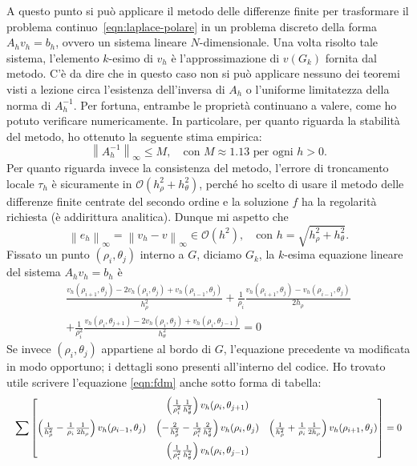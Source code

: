 \documentclass[a4paper]{article}
\newcommand{\bigO}[1]{\mathcal{O}\!\left(#1\right)}
\newcommand{\norminf}[1]{\left\lVert#1\right\rVert_\infty}
\begin{document}
A questo punto si può applicare il metodo delle differenze finite
per trasformare il problema continuo~\eqref{eqn:laplace-polare}
in un problema discreto della forma $A_h v_h = b_h$, ovvero
un sistema lineare $N$-dimensionale.
Una volta risolto tale sistema, l'elemento $k$-esimo di $v_h$
è l'approssimazione di $v(G_k)$ fornita dal metodo.
C'è da dire che in questo caso non si può applicare
nessuno dei teoremi visti a lezione circa
l'esistenza dell'inversa di $A_h$
o l'uniforme limitatezza della norma di $A_h^{-1}$.
Per fortuna, entrambe le proprietà continuano a valere,
come ho potuto verificare numericamente.
In particolare, per quanto riguarda la stabilità del metodo, ho ottenuto
la seguente stima empirica:
\[
\norminf{A_h^{-1}} \leq M, \quad \text{con $M \approx 1.13$ per ogni $h > 0$.}
\]
Per quanto riguarda invece la consistenza del metodo, l'errore di
troncamento locale $\tau_h$ è sicuramente in $\bigO{h_\rho^2 + h_\theta^2}$,
perché ho scelto di usare il metodo delle differenze finite centrate
del secondo ordine e la soluzione $f$ ha la regolarità
richiesta (è addirittura analitica). Dunque mi aspetto che
\[
\norminf{e_h} = \norminf{v_h-v} \in \bigO{h^2},
\quad \text{con $h = \sqrt{h_\rho^2 + h_\theta^2}$.}
\]
Fissato un punto $(\rho_i, \theta_j)$ interno a $G$, diciamo $G_k$,
la $k$-esima equazione lineare del sistema $A_h v_h = b_h$ è
\begin{equation} \label{eqn:fdm}
\begin{gathered}
\frac{v_h(\rho_{i+1},\theta_j)
    -2v_h(\rho_{i},  \theta_j)
     +v_h(\rho_{i-1},\theta_j)}{h_\rho^2}
+\frac{1}{\rho_i}
 \frac{v_h(\rho_{i+1},\theta_j)-v_h(\rho_{i-1},\theta_j)}{2h_\rho} \\[6pt]
+\frac{1}{\rho_i^2}
 \frac{v_h(\rho_i,\theta_{j+1})
     -2v_h(\rho_i,\theta_j)
      +v_h(\rho_i,\theta_{j-1})}{h_\theta^2} = 0
\end{gathered}
\end{equation}
Se invece $(\rho_i, \theta_j)$ appartiene al bordo di $G$,
l'equazione precedente va modificata in modo opportuno;
i dettagli sono presenti all'interno del codice.
Ho trovato utile scrivere l'equazione \eqref{eqn:fdm} anche sotto forma di tabella:
\begin{equation*}
\resizebox{\linewidth}{!}
{$
\displaystyle \sum
\begin{bmatrix}
&
\left(\frac{1}{\rho_i^2} \frac{1}{h_\theta^2}\right)
	v_h(\rho_i,\theta_{j+1})
& \\[8pt]
\left( \frac{1}{h_\rho^2} - \frac{1}{\rho_i} \frac{1}{2h_\rho} \right)
	v_h(\rho_{i-1},\theta_j) &
\left( -\frac{2}{h_\rho^2} - \frac{1}{\rho_i^2} \frac{2}{h_\theta^2} \right)
	v_h(\rho_i,\theta_j)     &
\left( \frac{1}{h_\rho^2} + \frac{1}{\rho_i} \frac{1}{2h_\rho} \right)
	v_h(\rho_{i+1},\theta_j) \\[8pt]
&
\left( \frac{1}{\rho_i^2} \frac{1}{h_\theta^2} \right) v_h(\rho_i,\theta_{j-1})
& \end{bmatrix} = 0
$}
\end{equation*}
\end{document}
